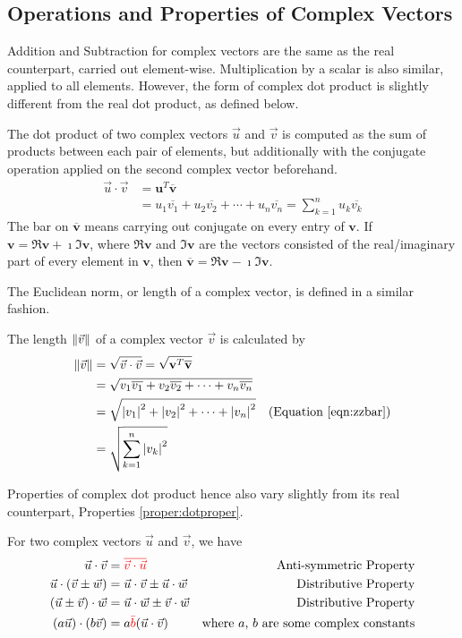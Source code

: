 \subsection{Operations and Properties of Complex Vectors}
Addition and Subtraction for complex vectors are the same as the real counterpart, carried out element-wise. Multiplication by a scalar is also similar, applied to all elements. However, the form of complex dot product is slightly different from the real dot product, as defined below.
\begin{defn}
\label{defn:complexdotproduct}
The dot product of two complex vectors $\vec{u}$ and $\vec{v}$ is computed as the sum of products between each pair of elements, but additionally with the conjugate operation applied on the second complex vector beforehand.
\begin{align*}
\vec{u} \cdot \vec{v} &= \textbf{u}^T \overline{\textbf{v}} \\
&= u_1\overline{v_1} + u_2\overline{v_2} + \cdots + u_n\overline{v_n} = \sum_{k=1}^{n} u_k\overline{v_k}
\end{align*}
The bar on $\overline{\textbf{v}}$ means carrying out conjugate on every entry of $\textbf{v}$. If $\textbf{v} = \Re{\textbf{v}} + \imath \Im{\textbf{v}}$, where $\Re{\textbf{v}}$ and $\Im{\textbf{v}}$ are the vectors consisted of the real/imaginary part of every element in $\textbf{v}$, then $\overline{\textbf{v}} = \Re{\textbf{v}} - \imath \Im{\textbf{v}}$.
\end{defn}
The Euclidean norm, or length of a complex vector, is defined in a similar fashion.
\begin{defn}
The length $\norm{\vec{v}}$ of a complex vector $\vec{v}$ is calculated by
\begin{align*}
\norm{\vec{v}} &= \sqrt{\vec{v} \cdot \vec{v}} = \sqrt{\textbf{v}^T \overline{\textbf{v}}}\\
&= \sqrt{v_1\overline{v_1} + v_2\overline{v_2} + \cdots + v_n\overline{v_n}} \\
&= \sqrt{\abs{v_1}^2 + \abs{v_2}^2 + \cdots + \abs{v_n}^2} & \text{(Equation \ref{eqn:zzbar})}\\
&= \sqrt{\sum_{k=1}^{n} \abs{v_k}^2}
\end{align*}
\end{defn}
Properties of complex dot product hence also vary slightly from its real counterpart, Properties \ref{proper:dotproper}.
\begin{proper}
\label{proper:complexdot}
For two complex vectors $\vec{u}$ and $\vec{v}$, we have
\begin{align*}
\vec{u} \cdot \vec{v} &= \textcolor{red}{\overline{\vec{v} \cdot \vec{u}}} &\text{Anti-symmetric Property} \\
\vec{u} \cdot (\vec{v} \pm \vec{w}) &= \vec{u} \cdot \vec{v} \pm \vec{u} \cdot \vec{w} &\text{Distributive Property} \\
(\vec{u} \pm \vec{v}) \cdot \vec{w} &= \vec{u} \cdot \vec{w} \pm \vec{v} \cdot \vec{w} &\text{Distributive Property} \\
(a\vec{u}) \cdot (b\vec{v}) &= a\textcolor{red}{\bar{b}}(\vec{u} \cdot \vec{v}) &\text{where $a$, $b$ are some complex constants}    
\end{align*}
\end{proper}
